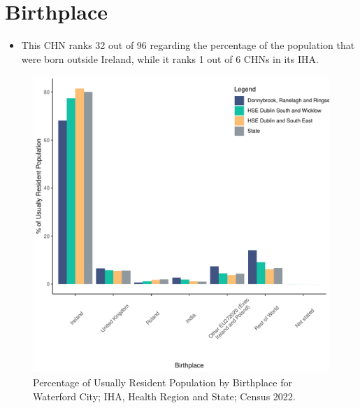\documentclass{article}
\begin{document}
\section{Birthplace}\label{sect:Birth}
\begin{itemize}
\item This CHN ranks  32 out of 96 regarding the percentage of the population that were born outside Ireland, while it ranks  1 out of 6 CHNs in its IHA.
\end{itemize}
\begin{figure}[H]
	\centering
	\includegraphics[width = 130mm]{../figures/BirthED.pdf}
	\caption{Percentage of Usually Resident Population by Birthplace for Waterford City; IHA, Health Region and State; Census 2022.}
	\label{fig:vbnv}
	\end{figure}
	
\end{document}

